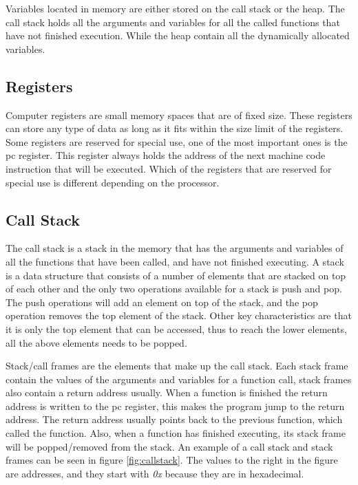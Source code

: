 Variables located in memory are either stored on the call stack or the heap.
The call stack holds all the arguments and variables for all the called functions that have not finished execution.
While the heap contain all the dynamically allocated variables.


\subsection{Registers}
Computer registers are small memory spaces that are of fixed size.
These registers can store any type of data as long as it fits within the size limit of the registers.
Some registers are reserved for special use, one of the most important ones is the \acrfull{pc} register.
This register always holds the address of the next machine code instruction that will be executed.
Which of the registers that are reserved for special use is different depending on the processor.


\subsection{Call Stack}
\label{sec:callstack}
The call stack is a stack in the memory that has the arguments and variables of all the functions that have been called, and have not finished executing.
A stack is a data structure that consists of a number of elements that are stacked on top of each other and the only two operations available for a stack is push and pop.
The push operations will add an element on top of the stack, and the pop operation removes the top element of the stack.
Other key characteristics are that it is only the top element that can be accessed, thus to reach the lower elements, all the above elements needs to be popped.


Stack/call frames are the elements that make up the call stack.
Each stack frame contain the values of the arguments and variables for a function call, stack frames also contain a return address usually.
When a function is finished the return address is written to the \acrshort{pc} register, this makes the program jump to the return address.
The return address usually points back to the previous function, which called the function.
Also, when a function has finished executing, its stack frame will be popped/removed from the stack.
An example of a call stack and stack frames can be seen in figure \ref{fig:callstack}.
The values to the right in the figure are addresses, and they start with \emph{0x} because they are in hexadecimal.


